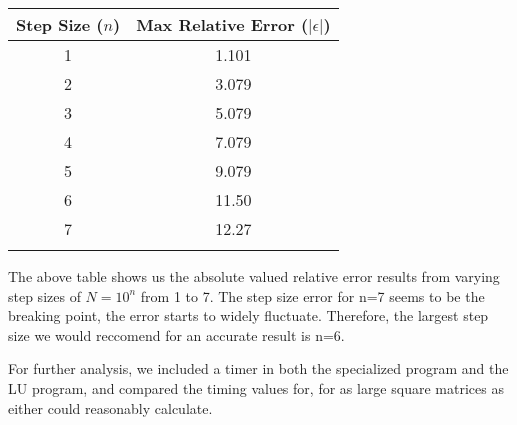 \documentclass[10pt,showpacs,preprintnumbers,footinbib,amsmath,amssymb,aps,prl,twocolumn,groupedaddress,superscriptaddress,showkeys]{revtex4-1}
\begin{document}
\begin{center}
	\begin{tabular}{cc}
		\hline \hline
			Step Size ($n$) &  Max Relative Error ($|\epsilon|$)\\
			\hline
			1 & 1.101\\
			2 & 3.079\\
			3 & 5.079\\
			4 & 7.079\\
			5 & 9.079\\
			6 & 11.50\\
			7 & 12.27\\
			\hline
			\label{errortable}
	\end{tabular}
\end{center}
	
	The above table shows us the absolute valued relative error results from varying step sizes of $N=10^{n}$ from 1 to 7. The step size error for n=7 seems to be the breaking point, the error starts to widely fluctuate. Therefore, the largest step size we would reccomend for an accurate result is n=6.  


	For further analysis, we included a timer in both the specialized program and the LU program, and compared the timing values for, for as large square matrices as either could reasonably calculate.
\end{document}
